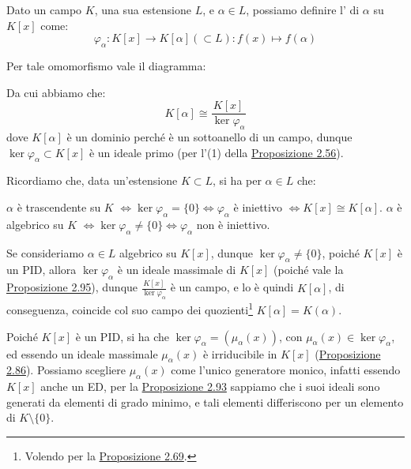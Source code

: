 \documentclass[11pt]{scrartcl}
\begin{document}
\begin{definition}
    Dato un campo $K$, una sua estensione $L$, e $\alpha \in L$, possiamo definire l' di $\alpha$ su $K[x]$ come:
    \[ \varphi_{\alpha} : K[x] \longrightarrow K[\alpha] (\subset L) : f(x) \longmapsto f(\alpha)
        \]
\end{definition}

Per tale omomorfismo vale il diagramma:
\begin{center}
\end{center}

Da cui abbiamo che:
\[ K[\alpha] \cong \frac{K[x]}{\ker \varphi_{\alpha}}
    \]
dove $K[\alpha]$ è un dominio perché è un sottoanello di un campo, dunque $\ker \varphi_{\alpha} \subset K[x]$ è un ideale primo (per l'(1) della \hyperref[2.56]{Proposizione 2.56}).

\begin{remark}
    Ricordiamo che, data un'estensione $K \subset L$, si ha per $\alpha \in L$ che:
	\begin{itemize}
	\ii $\alpha$ è trascendente su $K$ $\iff \ker{\varphi_\alpha} = \{0\} \iff \varphi_\alpha$ è iniettivo $\iff K[x] \cong K[\alpha]$.
	\ii $\alpha$ è algebrico su $K$ $\iff \ker{\varphi_\alpha} \ne \{0\} \iff \varphi_\alpha$ non è iniettivo.
	\end{itemize}
\end{remark}

Se consideriamo $\alpha \in L$ algebrico su $K[x]$, dunque $\ker \varphi_{\alpha} \ne \{0\}$, poiché $K[x]$ è un PID, allora $\ker \varphi_{\alpha}$ è un ideale massimale di $K[x]$ (poiché 
vale la \hyperref[2.95]{Proposizione 2.95}), dunque $\displaystyle \frac{K[x]}{\ker \varphi_{\alpha}}$ è un campo, e lo è quindi $K[\alpha]$, di conseguenza, coincide col
suo campo dei quozienti\footnote{Volendo per la \hyperref[2.69]{Proposizione 2.69}.} $K[\alpha] = K(\alpha)$.

\begin{remark}
    Poiché $K[x]$ è un PID, si ha che $\ker \varphi_{\alpha} = (\mu_{\alpha}(x))$, con $\mu_\alpha(x) \in \ker \varphi_\alpha$, ed essendo un ideale massimale $\mu_\alpha(x)$ è irriducibile in $K[x]$ (\hyperref[2.86]{Proposizione 2.86}).
    Possiamo scegliere $\mu_\alpha(x)$ come l'unico generatore monico, infatti essendo $K[x]$ anche un ED, per la \hyperref[2.93]{Proposizione 2.93} sappiamo che i suoi ideali sono generati da elementi di grado minimo, e tali elementi differiscono per un elemento di $K \setminus\{0\}$.
\end{remark}
\end{document}

